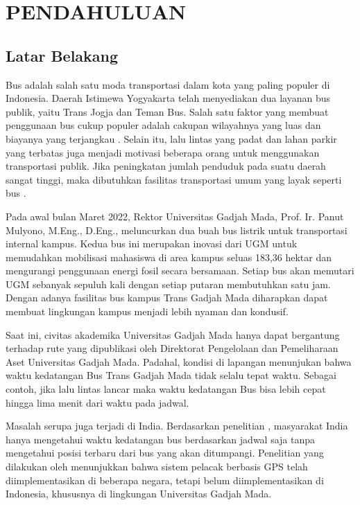 \chapter{PENDAHULUAN}

\section{Latar Belakang}
Bus adalah salah satu moda transportasi dalam kota yang paling populer di Indonesia. Daerah Istimewa Yogyakarta telah menyediakan dua layanan bus publik, yaitu Trans Jogja dan Teman Bus. Salah satu faktor yang membuat penggunaan bus cukup populer adalah cakupan wilayahnya yang luas dan biayanya yang terjangkau \cite{Rohani2013}. Selain itu, lalu lintas yang padat dan lahan parkir yang terbatas juga menjadi motivasi beberapa orang untuk menggunakan transportasi publik. Jika peningkatan jumlah penduduk pada suatu daerah sangat tinggi, maka dibutuhkan fasilitas transportasi umum yang layak seperti bus \cite{Sutandi2015}.

Pada awal bulan Maret 2022, Rektor Universitas Gadjah Mada, Prof. Ir. Panut Mulyono, M.Eng., D.Eng., meluncurkan dua buah bus listrik untuk transportasi internal kampus. Kedua bus ini merupakan inovasi dari UGM untuk memudahkan mobilisasi mahasiswa di area kampus seluas 183,36 hektar dan mengurangi penggunaan energi fosil secara bersamaan. Setiap bus akan memutari UGM sebanyak sepuluh kali dengan setiap putaran membutuhkan satu jam. Dengan adanya fasilitas bus kampus Trans Gadjah Mada diharapkan dapat membuat lingkungan kampus menjadi lebih nyaman dan kondusif.

Saat ini, civitas akademika Universitas Gadjah Mada hanya dapat bergantung terhadap rute yang dipublikasi oleh Direktorat Pengelolaan dan Pemeliharaan Aset Universitas Gadjah Mada. Padahal, kondisi di lapangan menunjukan bahwa waktu kedatangan Bus Trans Gadjah Mada tidak selalu tepat waktu. Sebagai contoh, jika lalu lintas lancar maka waktu kedatangan Bus bisa lebih cepat hingga lima menit dari waktu pada jadwal. 

Masalah serupa juga terjadi di India. Berdasarkan penelitian \cite{Sutar2016}, masyarakat India hanya mengetahui waktu kedatangan bus berdasarkan jadwal saja tanpa mengetahui posisi terbaru dari bus yang akan ditumpangi. Penelitian yang dilakukan oleh \cite{Sneha2014} menunjukkan bahwa sistem pelacak berbasis GPS telah diimplementasikan di beberapa negara, tetapi belum diimplementasikan di Indonesia, khususnya di lingkungan Universitas Gadjah Mada.

